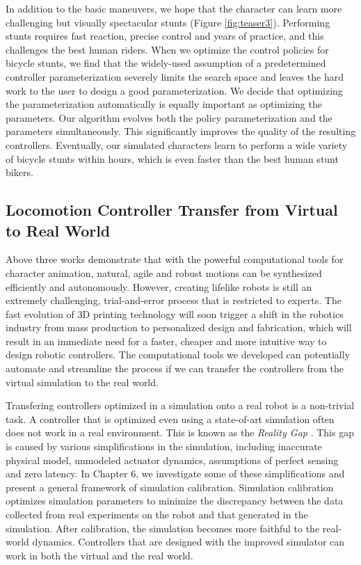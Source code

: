 In addition to the basic maneuvers, we hope that the character can learn more challenging but visually spectacular stunts (Figure \ref{fig:teaser3}). Performing stunts requires fast reaction, precise control and years of practice, and this challenges the best human riders. When we optimize the control policies for bicycle stunts, we find that the widely-used assumption of a predetermined controller parameterization severely limits the search space and leaves the hard work to the user to design a good parameterization. We decide that optimizing the parameterization automatically is equally important as optimizing the parameters. Our algorithm evolves both the policy parameterization and the parameters simultaneously. This significantly improves the quality of the resulting controllers. Eventually, our simulated characters learn to perform a wide variety of bicycle stunts within hours, which is even faster than the best human stunt bikers.

\subsection{Locomotion Controller Transfer from Virtual to Real World}

Above three works demonstrate that with the powerful computational tools for character animation, natural, agile and robust motions can be synthesized efficiently and autonomously. However, creating lifelike robots is still an extremely challenging, trial-and-error process that is restricted to experts. The fast evolution of 3D printing technology will soon trigger a shift in the robotics industry from mass production to personalized design and fabrication, which will result in an immediate need for a faster, cheaper and more intuitive way to design robotic controllers. The computational tools we developed can potentially automate and streamline the process if we can transfer the controllers from the virtual simulation to the real world.

Transfering controllers optimized in a simulation onto a real robot is a non-trivial task. A controller that is optimized even using a state-of-art simulation often does not work in a real environment. This is known as the \emph{Reality Gap} \cite{}. This gap is caused by various simplifications in the simulation, including inaccurate physical model, unmodeled actuator dynamics, assumptions of perfect sensing and zero latency. In Chapter 6, we investigate some of these simplifications and present a general framework of simulation calibration. Simulation calibration optimizes simulation parameters to minimize the discrepancy between the data collected from real experiments on the robot and that generated in the simulation. After calibration, the simulation becomes more faithful to the real-world dynamics. Controllers that are designed with the improved simulator can work in both the virtual and the real world. 

